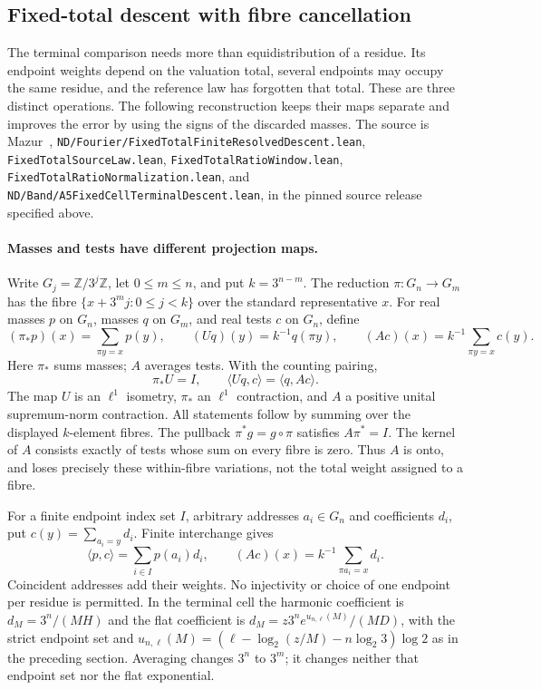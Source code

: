 \subsection{Fixed-total descent with fibre cancellation}
\label{sec:Mazur-descent}

The terminal comparison needs more than equidistribution of a residue.
Its endpoint weights depend on the valuation total, several endpoints
may occupy the same residue, and the reference law has forgotten that
total. These are three distinct operations. The following reconstruction
keeps their maps separate and improves the error by using the signs of
the discarded masses. The source is Mazur~\cite{Mazur2026v2},
\texttt{ND/Fourier/FixedTotalFiniteResolvedDescent.lean},
\texttt{FixedTotalSourceLaw.lean}, \texttt{FixedTotalRatioWindow.lean},
\texttt{FixedTotalRatioNormalization.lean}, and
\texttt{ND/Band/A5FixedCellTerminalDescent.lean}, in the pinned source
release specified above.

\paragraph{Masses and tests have different projection maps.}
Write $G_j=\mathbb Z/3^j\mathbb Z$, let $0\le m\le n$, and put
$k=3^{n-m}$. The reduction $\pi:G_n\to G_m$ has the fibre
$\{x+3^mj:0\le j<k\}$ over the standard representative $x$.
For real masses $p$ on $G_n$, masses $q$ on $G_m$, and real tests
$c$ on $G_n$, define
\begin{equation}
 (\pi_*p)(x)=\sum_{\pi y=x}p(y),\qquad
 (Uq)(y)=k^{-1}q(\pi y),\qquad
 (Ac)(x)=k^{-1}\sum_{\pi y=x}c(y).
 \label{eq:Mazur-descent-maps}
\end{equation}
Here $\pi_*$ sums masses; $A$ averages tests. With the counting pairing,
\[
 \pi_*U=I,\qquad \langle Uq,c\rangle=\langle q,Ac\rangle.
\]
The map $U$ is an $\ell^1$ isometry, $\pi_*$ an $\ell^1$ contraction,
and $A$ a positive unital supremum-norm contraction.
All statements follow by summing over the displayed $k$-element fibres.
The pullback $\pi^*g=g\circ\pi$ satisfies $A\pi^*=I$.
The kernel of $A$ consists exactly of tests whose sum on every fibre
is zero. Thus $A$ is onto, and loses precisely these within-fibre
variations, not the total weight assigned to a fibre.

For a finite endpoint index set $I$, arbitrary addresses $a_i\in G_n$
and coefficients $d_i$, put $c(y)=\sum_{a_i=y}d_i$. Finite interchange gives
\[
 \langle p,c\rangle=\sum_{i\in I}p(a_i)d_i,\qquad
 (Ac)(x)=k^{-1}\sum_{\pi a_i=x}d_i.
\]
Coincident addresses add their weights. No injectivity or choice of one
endpoint per residue is permitted. In the terminal cell the harmonic
coefficient is $d_M=3^n/(MH)$ and the flat coefficient is
$d_M=z3^n e^{u_{n,\ell}(M)}/(MD)$, with the strict endpoint set
and $u_{n,\ell}(M)=(\ell-\log_2(z/M)-n\log_2 3)\log2$
as in the preceding section. Averaging changes $3^n$ to $3^m$;
it changes neither that endpoint set nor the flat exponential.

